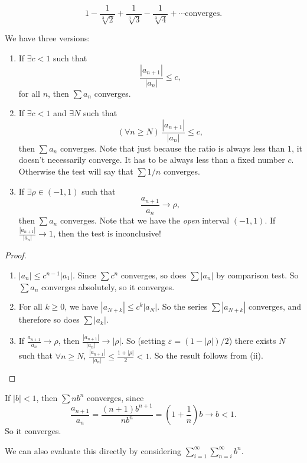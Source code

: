 \documentclass[a4paper]{article}
\begin{document}
\begin{eg}
  \[
    1 - \frac{1}{\sqrt[3]{2}} + \frac{1}{\sqrt[3]{3}} - \frac{1}{\sqrt[3]{4}} + \cdots \text{converges}.
  \]
\end{eg}

\begin{lemma}
  We have three versions:
  \begin{enumerate}
    \item If $\exists c < 1$ such that
      \[
        \frac{|a_{n + 1}|}{|a_n|} \leq c,
      \]
      for all $n$, then $\sum a_n$ converges.
    \item If $\exists c < 1$ and $\exists N$ such that
      \[
        (\forall n \geq N)\, \frac{|a_{n + 1}|}{|a_n|} \leq c,
      \]
      then $\sum a_n$ converges. Note that just because the ratio is always less than $1$, it doesn't necessarily converge. It has to be always less than a fixed number $c$. Otherwise the test will say that $\sum 1/n$ converges.
    \item If $\exists \rho \in (-1, 1)$ such that
      \[
        \frac{a_{n + 1}}{a_n} \to \rho,
      \]
      then $\sum a_n$ converges. Note that we have the \emph{open} interval $(-1, 1)$. If $\frac{|a_{n + 1}|}{|a_n|} \to 1$, then the test is inconclusive!
  \end{enumerate}
\end{lemma}

\begin{proof}\leavevmode
  \begin{enumerate}
    \item $|a_n| \leq c^{n - 1}|a_1|$. Since $\sum c^n$ converges, so does $\sum |a_n|$ by comparison test. So $\sum a_n$ converges absolutely, so it converges.
    \item For all $k\geq 0$, we have $|a_{N + k}|\leq c^k|a_N|$. So the series $\sum |a_{N + k}|$ converges, and therefore so does $\sum |a_k|$.
    \item If $\frac{a_{n + 1}}{a_n} \to \rho$, then $\frac{|a_{n + 1}|}{|a_n|} \to |\rho|$. So (setting $\varepsilon = (1 - |\rho|)/2$) there exists $N$ such that $\forall n \geq N$, $\frac{|a_{n + 1}|}{|a_n|} \leq \frac{1 + |\rho|}{2} < 1$. So the result follows from (ii).\qedhere
  \end{enumerate}
\end{proof}

\begin{eg}
  If $|b| < 1$, then $\sum nb^n$ converges, since
  \[
    \frac{a_{n + 1}}{a_n} = \frac{(n + 1) b^{n + 1}}{nb^n} = \left(1 + \frac{1}{n}\right) b\to b < 1.
  \]
  So it converges.

  We can also evaluate this directly by considering $\displaystyle\sum_{i = 1}^\infty \sum_{n = i}^\infty b^n$.
\end{eg}
\end{document}
